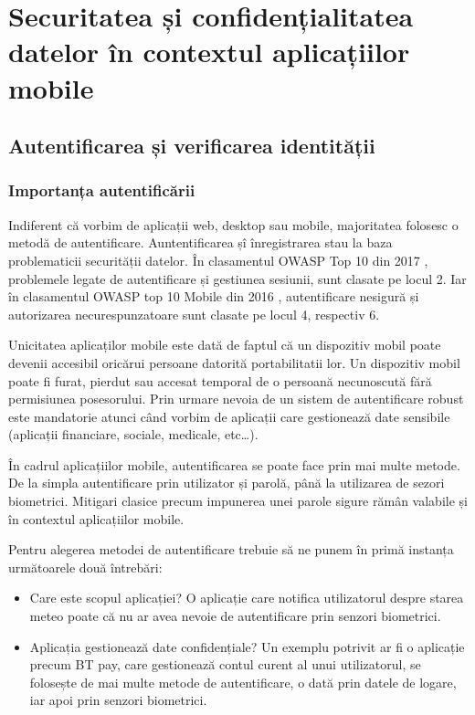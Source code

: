 \documentclass[12pt]{article}
\begin{document}
\newpage
\section{Securitatea și confidențialitatea datelor în contextul aplicațiilor mobile}
\subsection{Autentificarea și verificarea identității}
\subsubsection{Importanța autentificării}

Indiferent că vorbim de aplicații web, desktop sau mobile, majoritatea folosesc 
o metodă de autentificare. Auntentificarea șî înregistrarea stau la baza
problematicii securității datelor. În clasamentul OWASP Top 10 din 2017 \cite{owasp-top10-2017}, 
problemele legate de autentificare și gestiunea sesiunii, sunt clasate pe locul 2. Iar în
clasamentul OWASP top 10 Mobile din 2016 \cite{owasp-top10-mobile}, autentificare nesigură
și autorizarea necurespunzatoare sunt clasate pe locul 4, respectiv 6.

Unicitatea aplicaților mobile este dată de faptul că un dispozitiv mobil
poate devenii accesibil oricărui persoane datorită portabilitatii lor. Un dispozitiv mobil
poate fi furat, pierdut sau accesat temporal de o persoană necunoscută fără permisiunea
posesorului. Prin urmare nevoia de un sistem de autentificare robust este mandatorie 
atunci când vorbim de aplicații care gestionează date sensibile (aplicații financiare, sociale,
medicale, etc\dots).

\bigskip

În cadrul aplicațiilor mobile, autentificarea se poate face prin mai multe metode. De la
simpla autentificare prin utilizator și parolă, până la utilizarea de sezori biometrici.
Mitigari clasice precum impunerea unei parole sigure rămân valabile și în 
contextul aplicațiilor mobile.


Pentru alegerea metodei de autentificare trebuie să ne punem în primă instanța următoarele două
întrebări:

\begin{itemize}
    \item Care este scopul aplicației? O aplicație care notifica utilizatorul despre starea meteo poate 
    că nu ar avea nevoie de autentificare prin senzori biometrici. 
    \item Aplicația gestionează date confidențiale? Un exemplu potrivit ar fi o aplicație precum BT pay, care gestionează 
    contul curent al unui utilizatorul,
    se folosește de mai multe metode de autentificare, o dată prin datele de logare, iar apoi
    prin senzori biometrici.
\end{itemize}
\end{document}
